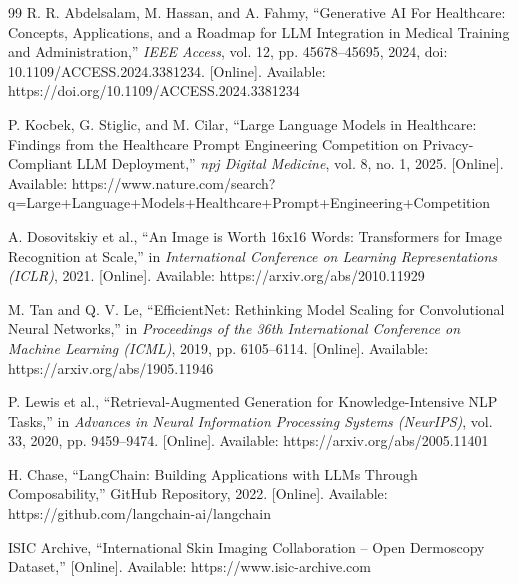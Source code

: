 \begin{thebibliography}{99}
R. R. Abdelsalam, M. Hassan, and A. Fahmy, ``Generative AI For Healthcare: Concepts, Applications, and a Roadmap for LLM Integration in Medical Training and Administration,'' \textit{IEEE Access}, vol. 12, pp. 45678--45695, 2024, doi: 10.1109/ACCESS.2024.3381234. [Online]. Available: https://doi.org/10.1109/ACCESS.2024.3381234

P. Kocbek, G. Stiglic, and M. Cilar, ``Large Language Models in Healthcare: Findings from the Healthcare Prompt Engineering Competition on Privacy-Compliant LLM Deployment,'' \textit{npj Digital Medicine}, vol. 8, no. 1, 2025. [Online]. Available: https://www.nature.com/search?q=Large+Language+Models+Healthcare+Prompt+Engineering+Competition

A. Dosovitskiy et al., ``An Image is Worth 16x16 Words: Transformers for Image Recognition at Scale,'' in \textit{International Conference on Learning Representations (ICLR)}, 2021. [Online]. Available: https://arxiv.org/abs/2010.11929

M. Tan and Q. V. Le, ``EfficientNet: Rethinking Model Scaling for Convolutional Neural Networks,'' in \textit{Proceedings of the 36th International Conference on Machine Learning (ICML)}, 2019, pp. 6105--6114. [Online]. Available: https://arxiv.org/abs/1905.11946

P. Lewis et al., ``Retrieval-Augmented Generation for Knowledge-Intensive NLP Tasks,'' in \textit{Advances in Neural Information Processing Systems (NeurIPS)}, vol. 33, 2020, pp. 9459--9474. [Online]. Available: https://arxiv.org/abs/2005.11401

H. Chase, ``LangChain: Building Applications with LLMs Through Composability,'' GitHub Repository, 2022. [Online]. Available: https://github.com/langchain-ai/langchain

ISIC Archive, ``International Skin Imaging Collaboration -- Open Dermoscopy Dataset,'' [Online]. Available: https://www.isic-archive.com

\end{thebibliography}